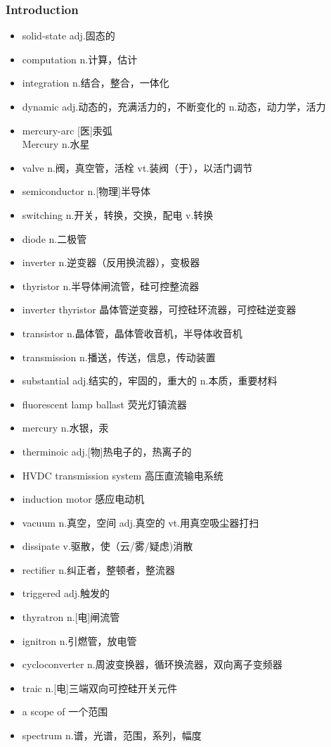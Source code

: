 \documentclass[11pt,a4paper,UTF8,titlepage]{ctexart} %
\begin{document}
    \subsubsection{Introduction}
    \begin{multicols}{2}
        \begin{itemize}
            \item solid-state adj.固态的
            \item computation n.计算，估计
            \item integration n.结合，整合，一体化
            \item dynamic adj.动态的，充满活力的，不断变化的 n.动态，动力学，活力
            \item mercury-arc [医]汞弧 \\Mercury n.水星
            \item valve n.阀，真空管，活栓 vt.装阀（于），以活门调节
            \item semiconductor n.[物理]半导体
            \item switching n.开关，转换，交换，配电 v.转换
            \item diode n.二极管
            \item inverter n.逆变器（反用换流器），变极器
            \item thyristor n.半导体闸流管，硅可控整流器
            \item inverter thyristor 晶体管逆变器，可控硅环流器，可控硅逆变器
            \item transistor n.晶体管，晶体管收音机，半导体收音机
            \item transmission n.播送，传送，信息，传动装置
            \item substantial adj.结实的，牢固的，重大的 n.本质，重要材料
            \item fluorescent lamp ballast 荧光灯镇流器
            \item mercury n.水银，汞
            \item therminoic adj.[物]热电子的，热离子的
            \item HVDC transmission system 高压直流输电系统
            \item induction motor 感应电动机
            \item vacuum n.真空，空间 adj.真空的 vt.用真空吸尘器打扫
            \item dissipate v.驱散，使（云/雾/疑虑)消散
            \item rectifier n.纠正者，整顿者，整流器
            \item triggered adj.触发的
            \item thyratron n.[电]闸流管
            \item ignitron n.引燃管，放电管
            \item cycloconverter n.周波变换器，循环换流器，双向离子变频器
            \item traic n.[电]三端双向可控硅开关元件
            \item a scope of 一个范围
            \item spectrum n.谱，光谱，范围，系列，幅度
        \end{itemize}
    \end{multicols}

    \ifx\collections\undefined
    \printbibliography %
    \clearpage %
    \printindex %
\end{document}
